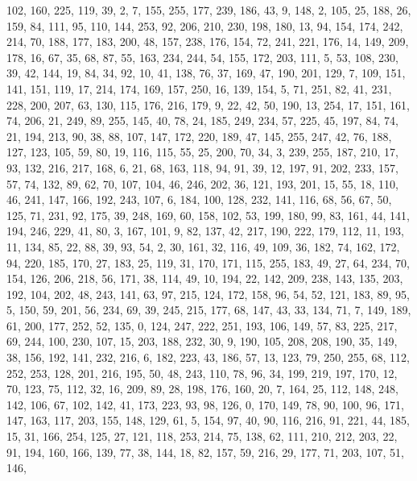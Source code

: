 \begin{DoxyCode}
       102, 160, 225, 119, 39, 2, 7, 155, 255, 177, 239, 186, 43, 9, 148, 2, 105, 25, 188, 26, 159, 84, 111, 95, 110,
       144, 253, 92, 206, 210, 230, 198, 180, 13, 94, 154, 174, 242, 214, 70, 188, 177, 183, 200, 48, 157, 238,
       176, 154, 72, 241, 221, 176, 14, 149, 209, 178, 16, 67, 35, 68, 87, 55, 163, 234, 244, 54, 155, 172, 203, 111,
       5, 53, 108, 230, 39, 42, 144, 19, 84, 34, 92, 10, 41, 138, 76, 37, 169, 47, 190, 201, 129, 7, 109, 151, 141,
       151, 119, 17, 214, 174, 169, 157, 250, 16, 139, 154, 5, 71, 251, 82, 41, 231, 228, 200, 207, 63, 130, 115,
       176, 216, 179, 9, 22, 42, 50, 190, 13, 254, 17, 151, 161, 74, 206, 21, 249, 89, 255, 145, 40, 78, 24, 185,
       249, 234, 57, 225, 45, 197, 84, 74, 21, 194, 213, 90, 38, 88, 107, 147, 172, 220, 189, 47, 145, 255, 247, 42,
       76, 188, 127, 123, 105, 59, 80, 19, 116, 115, 55, 25, 200, 70, 34, 3, 239, 255, 187, 210, 17, 93, 132, 216,
       217, 168, 6, 21, 68, 163, 118, 94, 91, 39, 12, 197, 91, 202, 233, 157, 57, 74, 132, 89, 62, 70, 107, 104,
       46, 246, 202, 36, 121, 193, 201, 15, 55, 18, 110, 46, 241, 147, 166, 192, 243, 107, 6, 184, 100, 128, 232,
       141, 116, 68, 56, 67, 50, 125, 71, 231, 92, 175, 39, 248, 169, 60, 158, 102, 53, 199, 180, 99, 83, 161, 44,
       141, 194, 246, 229, 41, 80, 3, 167, 101, 9, 82, 137, 42, 217, 190, 222, 179, 112, 11, 193, 11, 134, 85, 22,
       88, 39, 93, 54, 2, 30, 161, 32, 116, 49, 109, 36, 182, 74, 162, 172, 94, 220, 185, 170, 27, 183, 25, 119, 31,
       170, 171, 115, 255, 183, 49, 27, 64, 234, 70, 154, 126, 206, 218, 56, 171, 38, 114, 49, 10, 194, 22, 142,
       209, 238, 143, 135, 203, 192, 104, 202, 48, 243, 141, 63, 97, 215, 124, 172, 158, 96, 54, 52, 121, 183, 89,
       95, 5, 150, 59, 201, 56, 234, 69, 39, 245, 215, 177, 68, 147, 43, 33, 134, 71, 7, 149, 189, 61, 200, 177, 252,
       52, 135, 0, 124, 247, 222, 251, 193, 106, 149, 57, 83, 225, 217, 69, 244, 100, 230, 107, 15, 203, 188, 232,
       30, 9, 190, 105, 208, 208, 190, 35, 149, 38, 156, 192, 141, 232, 216, 6, 182, 223, 43, 186, 57, 13, 123,
       79, 250, 255, 68, 112, 252, 253, 128, 201, 216, 195, 50, 48, 243, 110, 78, 96, 34, 199, 219, 197, 170, 12, 70,
       123, 75, 112, 32, 16, 209, 89, 28, 198, 176, 160, 20, 7, 164, 25, 112, 148, 248, 142, 106, 67, 102, 142,
       41, 173, 223, 93, 98, 126, 0, 170, 149, 78, 90, 100, 96, 171, 147, 163, 117, 203, 155, 148, 129, 61, 5, 154,
       97, 40, 90, 116, 216, 91, 221, 44, 185, 15, 31, 166, 254, 125, 27, 121, 118, 253, 214, 75, 138, 62, 111, 210,
       212, 203, 22, 91, 194, 160, 166, 139, 77, 38, 144, 18, 82, 157, 59, 216, 29, 177, 71, 203, 107, 51, 146,

\end{DoxyCode}
